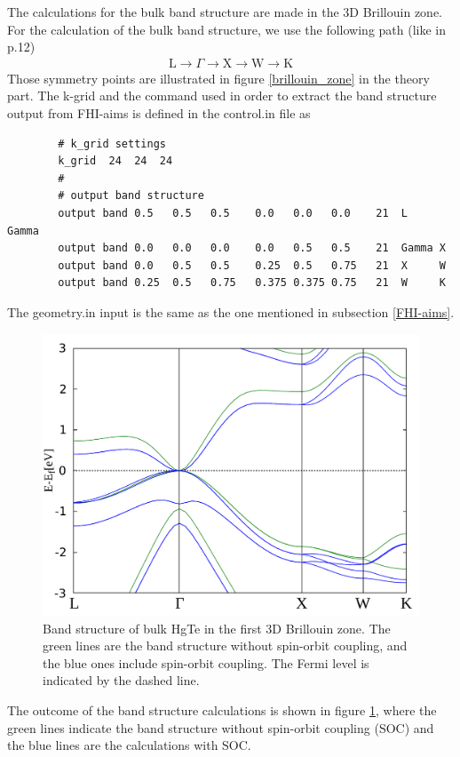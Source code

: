 	The calculations for the bulk band structure are made in the 3D Brillouin zone.
	For the calculation of the bulk band structure, we use the following path (like in \cite{tutorial2} p.12)
	\begin{align}
		\text{L} \rightarrow \Gamma \rightarrow \text{X} \rightarrow \text{W} \rightarrow \text{K}
	\end{align} 
	Those symmetry points are illustrated in figure \ref{brillouin_zone} in the theory part. The k-grid and 
	the command used in order to extract the band structure output from FHI-aims is defined in the control.in file as
	\\
	\begin{minipage}[c]{\linewidth}	\vspace{15pt}
		\begin{verbatim}
		# k_grid settings
		k_grid	24	24	24
		#
		# output band structure
		output band 0.5   0.5   0.5    0.0   0.0   0.0    21  L     Gamma
		output band 0.0   0.0   0.0    0.0   0.5   0.5    21  Gamma X
		output band 0.0   0.5   0.5    0.25  0.5   0.75   21  X     W
		output band 0.25  0.5   0.75   0.375 0.375 0.75   21  W     K
		\end{verbatim} \vspace{0.2cm}
	\end{minipage}
	The geometry.in input is the same as the one mentioned in subsection \ref{FHI-aims}. 	
	\begin{figure}[b!]
		\centering
		\includegraphics[width=.7\linewidth]{andere_bilder/plot_bulk_with_without_soc.pdf}
		\caption{Band structure of bulk HgTe in the first 3D Brillouin zone. The green lines are the band structure without spin-orbit coupling, and the blue ones include spin-orbit coupling. The Fermi level is indicated by the dashed line.} \label{bulk_band_structure}
	\end{figure}
	
	The outcome of the band structure calculations is shown in figure \ref{bulk_band_structure}, where the green lines indicate the band structure without spin-orbit coupling (SOC) and the blue lines are the calculations with SOC. 
